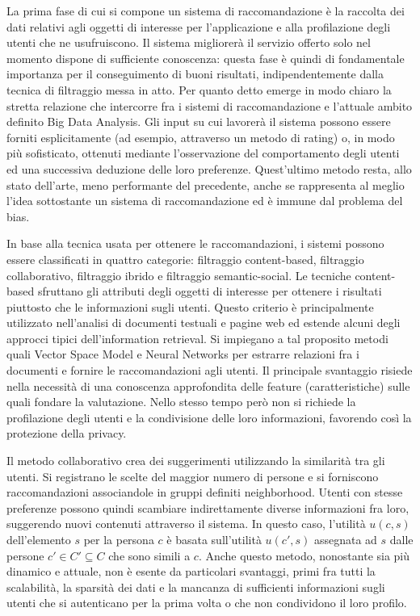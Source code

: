 \documentclass[Lau,binding=0.6cm,noexaminfo,oneside]{sapthesis}
\begin{document}
\medskip

La prima fase di cui si compone un sistema di raccomandazione è la raccolta dei dati relativi agli oggetti di interesse per l'applicazione e alla profilazione degli utenti che ne usufruiscono. Il sistema migliorerà il servizio offerto solo nel momento dispone di sufficiente conoscenza: questa fase è quindi di fondamentale importanza per il conseguimento di buoni risultati, indipendentemente dalla tecnica di filtraggio messa in atto. Per quanto detto emerge in modo chiaro la stretta relazione che intercorre fra i sistemi di raccomandazione e l'attuale ambito definito Big Data Analysis.
Gli input su cui lavorerà il sistema possono essere forniti esplicitamente (ad esempio, attraverso un metodo di rating) o, in modo più sofisticato, ottenuti mediante l'osservazione del comportamento degli utenti ed una successiva deduzione delle loro preferenze. Quest'ultimo metodo resta, allo stato dell'arte, meno performante del precedente, anche se rappresenta al meglio l'idea sottostante un sistema di raccomandazione ed è immune dal problema del bias.\medskip

In base alla tecnica usata per ottenere le raccomandazioni, i sistemi possono essere classificati in quattro categorie: filtraggio content-based, filtraggio collaborativo, filtraggio ibrido e filtraggio semantic-social. Le tecniche content-based sfruttano gli attributi degli oggetti di interesse per ottenere i risultati piuttosto che le informazioni sugli utenti.
Questo criterio è principalmente utilizzato nell'analisi di documenti testuali e pagine web ed estende alcuni degli approcci tipici dell'information retrieval. Si impiegano a tal proposito metodi quali Vector Space Model e Neural Networks per estrarre relazioni fra i documenti e fornire le raccomandazioni agli utenti. Il principale svantaggio risiede nella necessità di una conoscenza approfondita delle feature (caratteristiche) sulle quali fondare la valutazione. Nello stesso tempo però non si richiede la profilazione degli utenti e la condivisione delle loro informazioni, favorendo così la protezione della privacy.\medskip

Il metodo collaborativo crea dei suggerimenti utilizzando la similarità tra gli utenti. Si registrano le scelte del maggior numero di persone e si forniscono raccomandazioni associandole in gruppi definiti neighborhood. Utenti con stesse preferenze possono quindi scambiare indirettamente diverse informazioni fra loro, suggerendo nuovi contenuti attraverso il sistema.
In questo caso, l'utilità $u(c,s)$ dell'elemento $s$ per la persona $c$ è basata sull'utilità $u(c',s)$ assegnata ad $s$ dalle persone $c' \in C' \subseteq C$ che sono simili a $c$. Anche questo metodo, nonostante sia più dinamico e attuale, non è esente da particolari svantaggi, primi fra tutti la scalabilità, la sparsità dei dati e la mancanza di sufficienti informazioni sugli utenti che si autenticano per la prima volta o che non condividono il loro profilo.\medskip
\end{document}
